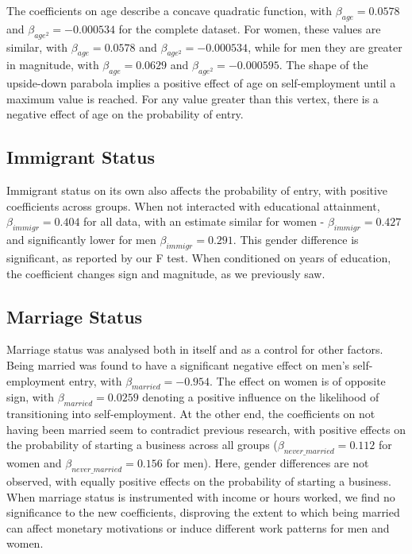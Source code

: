 The coefficients on age describe a concave quadratic function, with $\beta_{age} = 0.0578$ and $\beta_{age^2} = -0.000534$ for the complete dataset. For women, these values are similar, with $\beta_{age} = 0.0578$ and $\beta_{age^2} = -0.000534$, while for men they are greater in magnitude, with $\beta_{age} = 0.0629$ and $\beta_{age^2} = -0.000595$. The shape of the upside-down parabola implies a positive effect of age on self-employment until a maximum value is reached. For any value greater than this vertex, there is a negative effect of age on the probability of entry. 

\subsection{Immigrant Status}

Immigrant status on its own also affects the probability of entry, with positive coefficients across groups. When not interacted with educational attainment, $\beta_{immigr} = 0.404$ for all data, with an estimate similar for women - $\beta_{immigr} = 0.427$ and significantly lower for men $\beta_{immigr} = 0.291$. This gender difference is significant, as reported by our F test. When conditioned on years of education, the coefficient changes sign and magnitude, as we previously saw. 

\subsection{Marriage Status}

Marriage status was analysed both in itself and as a control for other factors. Being married was found to have a significant negative effect on men’s self-employment entry, with $\beta_{married} = -0.954$. The effect on women is of opposite sign, with $\beta_{married} = 0.0259$ denoting a positive influence on the likelihood of transitioning into self-employment. At the other end, the coefficients on not having been married seem to contradict previous research, with positive effects on the probability of starting a business across all groups ($\beta_{never\_married} = 0.112$ for women and $\beta_{never\_married} = 0.156$ for men). Here, gender differences are not observed, with equally positive effects on the probability of starting a business. When marriage status is instrumented with income or  hours worked, we find no significance to the new coefficients, disproving the extent to which being married can affect monetary motivations or induce different work patterns for men and women. 

